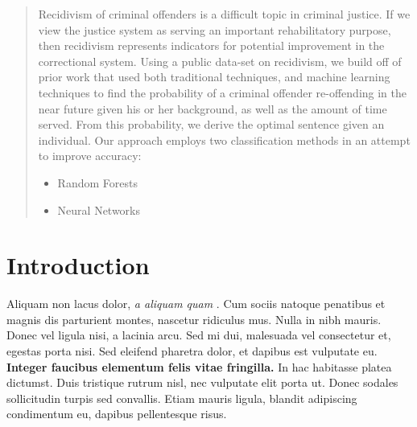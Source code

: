 \documentclass[a0,landscape]{a0poster}
\begin{document}
\begin{multicols}{4} %


\color{Navy} %

\begin{abstract}

Recidivism of criminal offenders is a difficult topic in criminal justice. If we view the justice system as serving an important rehabilitatory purpose, then recidivism represents indicators for potential improvement in the correctional system. Using a public data-set on recidivism, we build off of prior work that used both traditional techniques, and machine learning techniques to find the probability of a criminal offender re-offending in the near future given his or her background, as well as the amount of time served. From this probability, we derive the optimal sentence given an individual. Our approach employs two classification methods in an attempt to improve accuracy:

\begin{itemize}
\item Random Forests
\item Neural Networks
\end{itemize}

\end{abstract}


\color{SaddleBrown} %

\section*{Introduction}

Aliquam non lacus dolor, \textit{a aliquam quam} \cite{Smith:2012qr}. Cum sociis natoque penatibus et magnis dis parturient montes, nascetur ridiculus mus. Nulla in nibh mauris. Donec vel ligula nisi, a lacinia arcu. Sed mi dui, malesuada vel consectetur et, egestas porta nisi. Sed eleifend pharetra dolor, et dapibus est vulputate eu. \textbf{Integer faucibus elementum felis vitae fringilla.} In hac habitasse platea dictumst. Duis tristique rutrum nisl, nec vulputate elit porta ut. Donec sodales sollicitudin turpis sed convallis. Etiam mauris ligula, blandit adipiscing condimentum eu, dapibus pellentesque risus.


\end{multicols}
\end{document}
